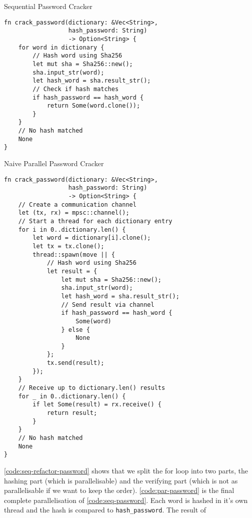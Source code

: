 \documentclass[conference]{IEEEtran}
\begin{document}
\begin{algorithm}
\caption{Sequential Password Cracker}
\label{code:seq-password}
\begin{verbatim}
fn crack_password(dictionary: &Vec<String>,
                  hash_password: String)
                  -> Option<String> {
    for word in dictionary {
        // Hash word using Sha256
        let mut sha = Sha256::new();
        sha.input_str(word);
        let hash_word = sha.result_str();
        // Check if hash matches
        if hash_password == hash_word {
            return Some(word.clone());
        }
    }
    // No hash matched
    None
}
\end{verbatim}
\end{algorithm}

\begin{algorithm}
\caption{Naive Parallel Password Cracker}
\label{code:par-naive-password}
\begin{verbatim}
fn crack_password(dictionary: &Vec<String>,
                  hash_password: String)
                  -> Option<String> {
    // Create a communication channel
    let (tx, rx) = mpsc::channel();
    // Start a thread for each dictionary entry
    for i in 0..dictionary.len() {
        let word = dictionary[i].clone();
        let tx = tx.clone();
        thread::spawn(move || {
            // Hash word using Sha256
            let result = {
                let mut sha = Sha256::new();
                sha.input_str(word);
                let hash_word = sha.result_str();
                // Send result via channel
                if hash_password == hash_word {
                    Some(word)
                } else {
                    None
                }
            };
            tx.send(result);
        });
    }
    // Receive up to dictionary.len() results
    for _ in 0..dictionary.len() {
        if let Some(result) = rx.receive() {
            return result;
        }
    }
    // No hash matched
    None
}
\end{verbatim}
\end{algorithm}

\autoref{code:seq-refactor-password} shows that we split the for loop into two parts, the hashing part (which is parallelisable) and the verifying part (which is not as parallelisable if we want to keep the order). \autoref{code:par-password} is the final complete parallelisation of \autoref{code:seq-password}. Each word is hashed in it's own thread and the hash is compared to \texttt{hash\_password}. The result of
\end{document}
